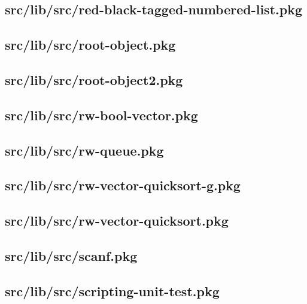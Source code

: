 \subsection{src/lib/src/red-black-tagged-numbered-list.pkg}


\subsection{src/lib/src/root-object.pkg}


\subsection{src/lib/src/root-object2.pkg}


\subsection{src/lib/src/rw-bool-vector.pkg}


\subsection{src/lib/src/rw-queue.pkg}


\subsection{src/lib/src/rw-vector-quicksort-g.pkg}


\subsection{src/lib/src/rw-vector-quicksort.pkg}


\subsection{src/lib/src/scanf.pkg}


\subsection{src/lib/src/scripting-unit-test.pkg}



